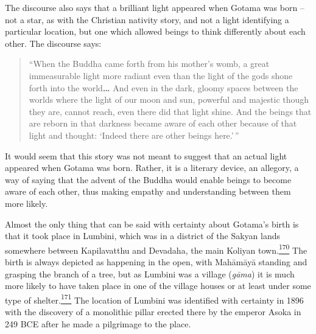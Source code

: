 The discourse also says that a brilliant light appeared when Gotama was
born -- not a star, as with the Christian nativity story, and not a
light identifying a particular location, but one which allowed beings to
think differently about each other. The discourse says:

\begin{quote}
``When the Buddha came forth from his mother's womb, a great
immeasurable light more radiant even than the light of the gods shone
forth into the world\textbf{\ldots{}} And even in the dark, gloomy
spaces between the worlds where the light of our moon and sun, powerful
and majestic though they are, cannot reach, even there did that light
shine. And the beings that are reborn in that darkness became aware of
each other because of that light and thought: `Indeed there are other
beings here.'\,''
\end{quote}

It would seem that this story was not meant to suggest that an actual
light appeared when Gotama was born. Rather, it is a literary device, an
allegory, a way of saying that the advent of the Buddha would enable
beings to become aware of each other, thus making empathy and
understanding between them more likely.

Almost the only thing that can be said with certainty about Gotama's
birth is that it took place in Lumbini, which was in a district of the
Sakyan lands somewhere between Kapilavatthu and Devadaha, the main
Koliyan
town.\label{footprints_split_008.html_fnref170}\hyperref[footprints_split_024.htmlux5cux23fn170]{\textsuperscript{170}}
The birth is always depicted as happening in the open, with Mahāmāyā
standing and grasping the branch of a tree, but as Lumbini was a village
(\emph{gāma}) it is much more likely to have taken place in one of the
village houses or at least under some type of
shelter.\label{footprints_split_008.html_fnref171}\hyperref[footprints_split_024.htmlux5cux23fn171]{\textsuperscript{171}}
The location of Lumbini was identified with certainty in 1896 with the
discovery of a monolithic pillar erected there by the emperor Asoka in
249 BCE after he made a pilgrimage to the place.


